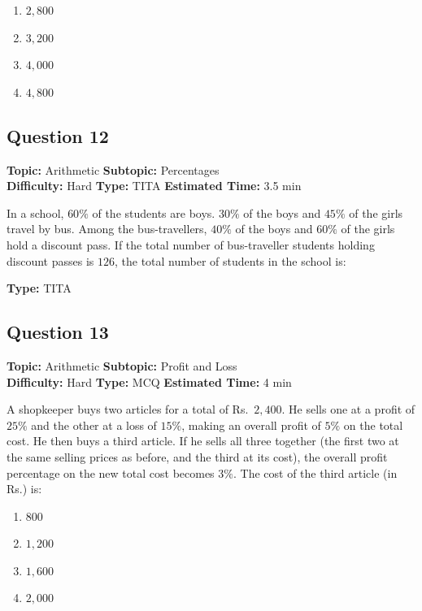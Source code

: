 \documentclass[11pt]{article}
\begin{document}
\begin{enumerate}[label=(\Alph*)]
    \item \(2{,}800\)
    \item \(3{,}200\)
    \item \(4{,}000\)
    \item \(4{,}800\)
\end{enumerate}

\subsection*{Question 12}
\textbf{Topic:} Arithmetic \quad \textbf{Subtopic:} Percentages \\
\textbf{Difficulty:} Hard \quad \textbf{Type:} TITA \quad \textbf{Estimated Time:} 3.5 min

\begin{tcolorbox}
In a school, \(60\%\) of the students are boys. \(30\%\) of the boys and \(45\%\) of the girls travel by bus. Among the bus-travellers, \(40\%\) of the boys and \(60\%\) of the girls hold a discount pass. If the total number of bus-traveller students holding discount passes is \(126\), the total number of students in the school is:
\end{tcolorbox}

\textbf{Type:} TITA

\subsection*{Question 13}
\textbf{Topic:} Arithmetic \quad \textbf{Subtopic:} Profit and Loss \\
\textbf{Difficulty:} Hard \quad \textbf{Type:} MCQ \quad \textbf{Estimated Time:} 4 min

\begin{tcolorbox}
A shopkeeper buys two articles for a total of Rs.~\(2{,}400\). He sells one at a profit of \(25\%\) and the other at a loss of \(15\%\), making an overall profit of \(5\%\) on the total cost. He then buys a third article. If he sells all three together (the first two at the same selling prices as before, and the third at its cost), the overall profit percentage on the new total cost becomes \(3\%\). The cost of the third article (in Rs.) is:
\end{tcolorbox}

\begin{enumerate}[label=(\Alph*)]
    \item \(800\)
    \item \(1{,}200\)
    \item \(1{,}600\)
    \item \(2{,}000\)
\end{enumerate}
\end{document}
